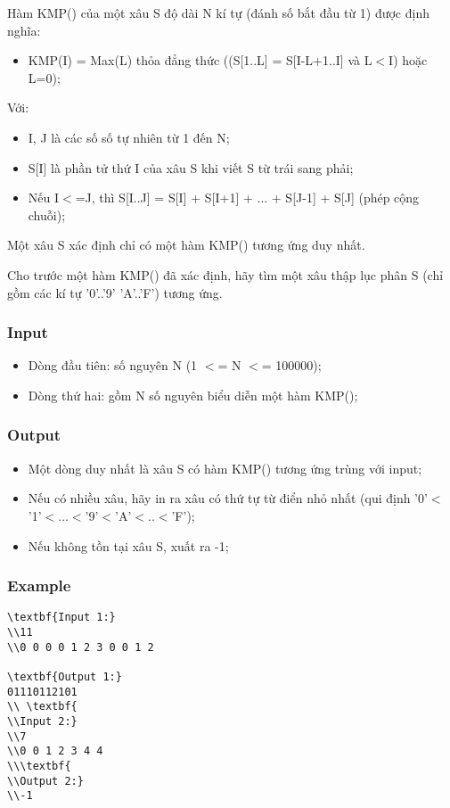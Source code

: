 



   Hàm KMP() của một xâu S độ dài N kí tự (đánh số bắt đầu từ 1) được định nghĩa:  
\begin{itemize}
	\item     KMP(I) = Max(L) thỏa đẳng thức ((S[1..L] = S[I-L+1..I] và L$<$I) hoặc L=0);   
\end{itemize}

   Với:  
\begin{itemize}
	\item     I, J là các số số tự nhiên từ 1 đến N;   
	\item     S[I] là phần tử thứ I của xâu S khi viết S từ trái sang phải;   
	\item     Nếu I$<$=J, thì S[I..J] = S[I] + S[I+1] + ... + S[J-1] + S[J] (phép cộng chuỗi);   
\end{itemize}

   Một xâu S xác định chỉ có một hàm KMP() tương ứng duy nhất.  

   Cho trước một hàm KMP() đã xác định, hãy tìm một xâu thập lục phân S (chỉ gồm các kí tự '0'..'9' 'A'..'F') tương ứng.  

\subsubsection{   Input  }
\begin{itemize}
	\item     Dòng đầu tiên: số nguyên N (1 $<$= N $<$= 100000);   
	\item     Dòng thứ hai: gồm N số nguyên biểu diễn một hàm KMP();   
\end{itemize}

\subsubsection{   Output  }
\begin{itemize}
	\item     Một dòng duy nhất là xâu S có hàm KMP() tương ứng trùng với input;   
	\item     Nếu có nhiều xâu, hãy in ra xâu có thứ tự từ điển nhỏ nhất (qui định '0'$<$'1'$<$...$<$'9'$<$'A'$<$..$<$'F');   
	\item     Nếu không tồn tại xâu S, xuất ra -1;   
\end{itemize}

\subsubsection{   Example  }
\begin{verbatim}
\textbf{Input 1:}
\\11
\\0 0 0 0 1 2 3 0 0 1 2

\textbf{Output 1:}
01110112101
\\ \textbf{
\\Input 2:}
\\7
\\0 0 1 2 3 4 4
\\\textbf{
\\Output 2:}
\\-1\end{verbatim}